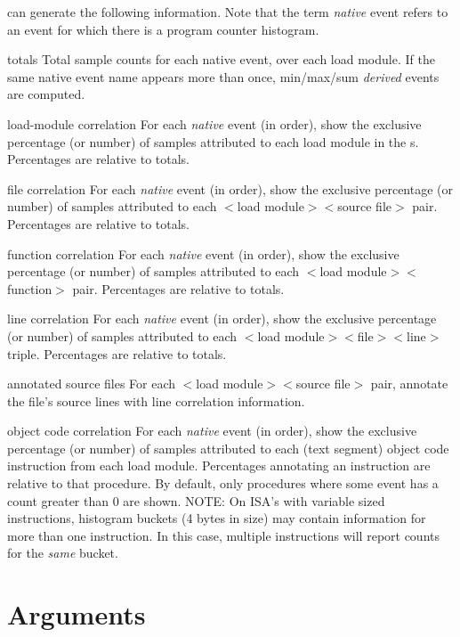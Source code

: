 \documentclass[english]{article}
\begin{document}
 can generate the following information.  Note that the term \emph{native} event refers to an event for which there is a program counter histogram.  
\begin{Description}
  \item[totals] Total sample counts for each native event, over each load module.  If the same native event name appears more than once, min/max/sum \emph{derived} events are computed.
  \item[load-module correlation] For each \emph{native} event (in order), show the exclusive percentage (or number) of samples attributed to each load module in the s.  
Percentages are relative to totals.
  \item[file correlation] For each \emph{native} event (in order), show the exclusive percentage (or number) of samples attributed to each $<$load module$>$$<$source file$>$ pair.  
Percentages are relative to totals.
  \item[function correlation] For each \emph{native} event (in order), show the exclusive percentage (or number) of samples attributed to each $<$load module$>$$<$function$>$ pair.
Percentages are relative to totals.
  \item[line correlation] For each \emph{native} event (in order), show the exclusive percentage (or number) of samples attributed to each $<$load module$>$$<$file$>$$<$line$>$ triple.
Percentages are relative to totals.
  \item[annotated source files] For each $<$load module$>$$<$source file$>$ pair, annotate the file's source lines with line correlation information.
  \item[object code correlation] For each \emph{native} event (in order), show the exclusive percentage (or number) of samples attributed to each (text segment) object code instruction from each load module.
Percentages annotating an instruction are relative to that procedure.
By default, only procedures where some event has a count greater than 0 are shown.
NOTE: On ISA's with variable sized instructions, histogram buckets (4 bytes in size) may contain information for more than one instruction.  In this case, multiple instructions will report counts for the \emph{same} bucket.
\end{Description}

\section{Arguments}
\end{document}

